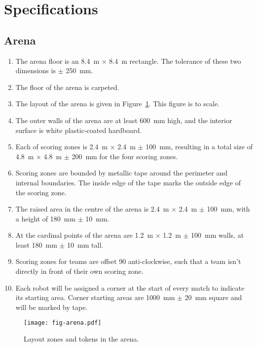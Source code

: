 \section{Specifications}
\label{sec:specs}

\subsection{Arena}
\label{spec:arena}

\begin{enumerate}
  \item The arena floor is an \SI{8.4}{m} $\times$ \SI{8.4}{m} rectangle. The
        tolerance of these two dimensions is $\pm$ \SI{250}{mm}.
  \item The floor of the arena is carpeted.
  \item The layout of the arena is given in Figure~\ref{fig:arena}. This
        figure is to scale.
  \item The outer walls of the arena are at least \SI{600}{mm} high, and the
        interior surface is white plastic-coated hardboard.
  \item Each of scoring zones is \SI{2.4}{m} $\times$ \SI{2.4}{m} $\pm$ \SI{100}{mm},
        resulting in a total size of \SI{4.8}{m} $\times$ \SI{4.8}{m} $\pm$ \SI{200}{mm}
        for the four scoring zones.
  \item Scoring zones are bounded by metallic tape around the perimeter
        and internal boundaries. The inside edge of the tape marks the outside
        edge of the scoring zone.
  \item The raised area in the centre of the arena is \SI{2.4}{m} $\times$ \SI{2.4}{m} $\pm$ \SI{100}{mm},
        with a height of \SI{180}{mm} $\pm$ \SI{10}{mm}.
  \item At the cardinal points of the arena are \SI{1.2}{m} $\times$ \SI{1.2}{m} $\pm$ \SI{100}{mm} walls,
        at least \SI{180}{mm} $\pm$ \SI{10}{mm} tall.
  \item Scoring zones for teams are offset 90\degree{} anti-clockwise, such
        that a team isn't directly in front of their own scoring zone.
  \item Each robot will be assigned a corner at the start of every match to indicate its starting area.
        Corner starting areas are \SI{1000}{mm} $\pm$ \SI{20}{mm} square and will be marked by tape.
\end{enumerate}

\begin{figure}
  \texttt{[image: fig-arena.pdf]}
  \caption{Layout zones and tokens in the arena.}
  \label{fig:arena}
\end{figure}

